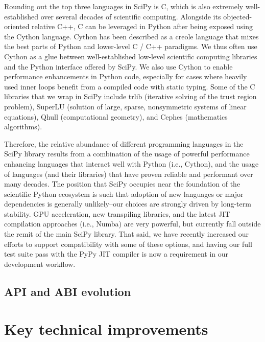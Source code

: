 \documentclass[fleqn,10pt]{wlscirep}
\begin{document}
Rounding out the top three languages in SciPy is C, which is also extremely
well-established over several decades\cite{Kernighan:1988:CPL:576122} of
scientific computing. Alongside its objected-oriented relative C++, C
can be leveraged in Python after being exposed using the Cython
language. Cython has been described as a creole language that mixes
the best parts of Python and lower-level C / C++
paradigms\cite{behnel2011cython}. We thus often use Cython as a glue
between well-established low-level scientific computing libraries and
the Python interface offered by SciPy. We also use Cython to enable
performance enhancements in Python code, especially for cases where heavily
used inner loops benefit from a compiled code with static typing. Some of the C
libraries that we wrap in SciPy include trlib\cite{doi:10.1080/10556788.2018.1449842} 
(iterative solving of the trust region problem), SuperLU\cite{li05,superlu_ug99} (solution of
large, sparse, nonsymmetric systems of linear equations),
Qhull\cite{Barber:1996:QAC:235815.235821} (computational
geometry), and Cephes\cite{cephes_netlib} (mathematics algorithms). 

Therefore, the relative abundance of different programming languages
in the SciPy library results from a combination of the usage of powerful performance
enhancing languages that interact well with Python (i.e., Cython), and
the usage of languages (and their libraries) that have proven reliable
and performant over many decades. The position that SciPy occupies
near the foundation of the scientific Python ecosystem is such that
adoption of new languages or major dependencies is generally unlikely--our
choices are strongly driven by long-term stability. GPU acceleration,
new transpiling libraries, and the latest JIT compilation approaches
(i.e., Numba\cite{Lam:2015:NLP:2833157.2833162}) are very powerful, but currently fall outside the remit
of the main SciPy library. That said, we have recently increased our
efforts to support compatibility with some of these options, and having
our full test suite pass with the PyPy JIT compiler\cite{Bolz:2009:TMP:1565824.1565827}
is now a requirement in our development workflow.

\subsection*{API and ABI evolution}


\section*{Key technical improvements}
\end{document}
